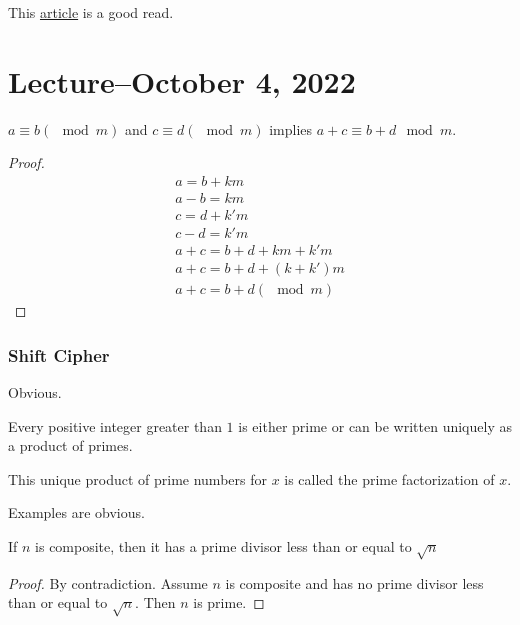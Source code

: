 \documentclass{scrreprt}
\begin{document}
\begin{remark}
    This \href{https://www.math.cmu.edu/~mradclif/teaching/127S19/Notes/Infinite%20Cardinality.pdf}{article} is a good read.
\end{remark}

\section{Lecture--October 4, 2022}

\begin{theorem}
    $a\equiv b(\mod m)$ and $c\equiv d(\mod m)$ implies $a + c \equiv b + d \mod m$.
    \begin{proof}
        \begin{align*}
            a = b + km                \\
            a - b = km                \\
            c = d + k'm               \\
            c - d = k'm               \\
            a + c = b + d + km + k'm  \\
            a + c = b + d + (k + k')m \\
            a + c = b + d (\mod m)
        \end{align*}
    \end{proof}
\end{theorem}

\subsubsection{Shift Cipher}
Obvious.

\begin{definition}
    Every positive integer greater than $1$ is either prime or can
    be written uniquely as a product of primes.

    This unique product of prime numbers for $x$ is called the prime factorization of $x$.
\end{definition}


Examples are obvious.

\begin{theorem}
    If $n$ is composite, then it has a prime divisor less than or equal to $\sqrt{n}$

    \begin{proof}
        By contradiction. Assume $n$ is composite and has no prime divisor less than or equal to $\sqrt{n}$. Then $n$ is prime.
    \end{proof}
\end{theorem}
\end{document}
